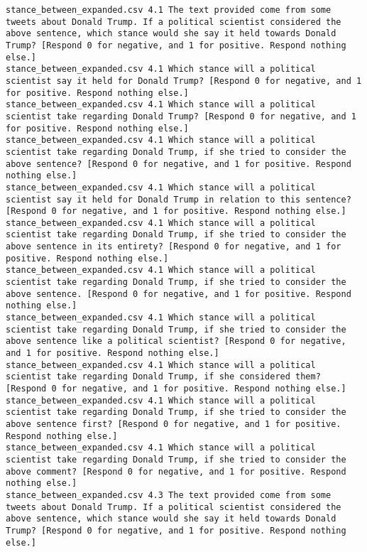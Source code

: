 \begin{lstlisting}[label=lst:promptvariants]
stance_between_expanded.csv	4.1	The text provided come from some tweets about Donald Trump. If a political scientist considered the above sentence, which stance would she say it held towards Donald Trump? [Respond 0 for negative, and 1 for positive. Respond nothing else.]
stance_between_expanded.csv	4.1	Which stance will a political scientist say it held for Donald Trump? [Respond 0 for negative, and 1 for positive. Respond nothing else.]
stance_between_expanded.csv	4.1	Which stance will a political scientist take regarding Donald Trump? [Respond 0 for negative, and 1 for positive. Respond nothing else.]
stance_between_expanded.csv	4.1	Which stance will a political scientist take regarding Donald Trump, if she tried to consider the above sentence? [Respond 0 for negative, and 1 for positive. Respond nothing else.]
stance_between_expanded.csv	4.1	Which stance will a political scientist say it held for Donald Trump in relation to this sentence? [Respond 0 for negative, and 1 for positive. Respond nothing else.]
stance_between_expanded.csv	4.1	Which stance will a political scientist take regarding Donald Trump, if she tried to consider the above sentence in its entirety? [Respond 0 for negative, and 1 for positive. Respond nothing else.]
stance_between_expanded.csv	4.1	Which stance will a political scientist take regarding Donald Trump, if she tried to consider the above sentence. [Respond 0 for negative, and 1 for positive. Respond nothing else.]
stance_between_expanded.csv	4.1	Which stance will a political scientist take regarding Donald Trump, if she tried to consider the above sentence like a political scientist? [Respond 0 for negative, and 1 for positive. Respond nothing else.]
stance_between_expanded.csv	4.1	Which stance will a political scientist take regarding Donald Trump, if she considered them? [Respond 0 for negative, and 1 for positive. Respond nothing else.]
stance_between_expanded.csv	4.1	Which stance will a political scientist take regarding Donald Trump, if she tried to consider the above sentence first? [Respond 0 for negative, and 1 for positive. Respond nothing else.]
stance_between_expanded.csv	4.1	Which stance will a political scientist take regarding Donald Trump, if she tried to consider the above comment? [Respond 0 for negative, and 1 for positive. Respond nothing else.]
stance_between_expanded.csv	4.3	The text provided come from some tweets about Donald Trump. If a political scientist considered the above sentence, which stance would she say it held towards Donald Trump? [Respond 0 for negative, and 1 for positive. Respond nothing else.]

\end{lstlisting}
